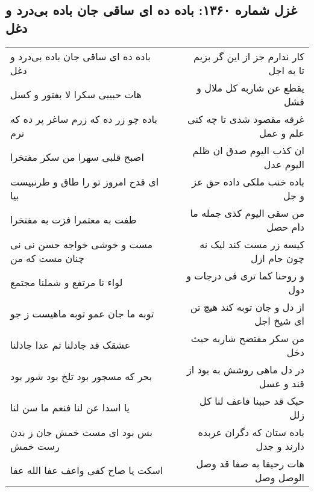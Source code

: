 \begin{center}
\section*{غزل شماره ۱۳۶۰: باده ده ای ساقی جان باده بی‌درد و دغل}
\label{sec:1360}
\begin{longtable}{l p{0.5cm} r}
باده ده ای ساقی جان باده بی‌درد و دغل
&&
کار ندارم جز از این گر بزیم تا به اجل
\\
هات حبیبی سکرا لا بفتور و کسل
&&
یقطع عن شاربه کل ملال و فشل
\\
باده چو زر ده که زرم ساغر پر ده که نرم
&&
غرقه مقصود شدی تا چه کنی علم و عمل
\\
اصبح قلبی سهرا من سکر مفتخرا
&&
ان کذب الیوم صدق ان ظلم الیوم عدل
\\
ای قدح امروز تو را طاق و طرنبیست بیا
&&
باده خنب ملکی داده حق عز و جل
\\
طفت به معتمرا فزت به مفتخرا
&&
من سقی الیوم کذی جمله ما دام حصل
\\
مست و خوشی خواجه حسن نی نی چنان مست که من
&&
کیسه زر مست کند لیک نه چون جام ازل
\\
لواء نا مرتفع و شملنا مجتمع
&&
و روحنا کما تری فی درجات و دول
\\
توبه ما جان عمو توبه ماهیست ز جو
&&
از دل و جان توبه کند هیچ تن ای شیخ اجل
\\
عشقک قد جادلنا ثم عدا جادلنا
&&
من سکر مفتضح شاربه حیث دخل
\\
بحر که مسجور بود تلخ بود شور بود
&&
در دل ماهی روشش به بود از قند و عسل
\\
یا اسدا عن لنا فنعم ما سن لنا
&&
حبک قد حببنا فاعف لنا کل زلل
\\
بس بود ای مست خمش جان ز بدن رست خمش
&&
باده ستان که دگران عربده دارند و جدل
\\
اسکت یا صاح کفی واعف عفا الله عفا
&&
هات رحیقا به صفا قد وصل الوصل وصل
\\
\end{longtable}
\end{center}
